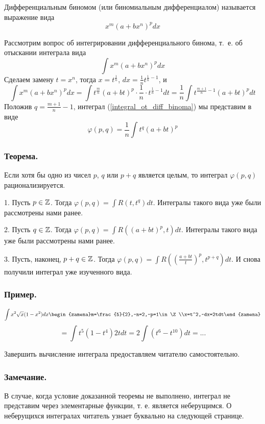 \opred
Дифференциальным биномом (или биномиальным дифференциалом) называется выражение вида
$$x^m(a+bx^n)^p dx$$

Рассмотрим вопрос об интегрировании дифференциального бинома, т.~е. об отыскании интеграла вида
\begin{equation}\label{integral_ot_diff_binoma}
\int x^m(a+bx^n)^p dx
\end{equation}
Сделаем замену $t=x^n$, тогда $x=t^{\frac{1}{n}}$, $dx=\frac{1}{n}t^{\frac{1}{n}-1}$, и 
$$
\int x^m(a+bx^n)^p dx=
\int t^{\frac{m}{n}}(a+bt)^p\cdot \frac{1}{n}\cdot t^{\frac{1}{n}-1}dt=
\frac{1}{n}\int t^{\frac{m+1}{n}-1}(a+bt)^p dt
$$
Положив $q=\frac{m+1}{n}-1$, интеграл (\ref{integral_ot_diff_binoma}) мы представим в виде
$$\varphi(p,q)=\frac{1}{n}\int t^q(a+bt)^p$$

\subsubsection{Теорема.}
Если хотя бы одно из чисел $p$, $q$ или $p+q$ является целым, то интеграл $\varphi(p,q)$ рационализируется.

\dokvo

1. Пусть $p\in\mathbb{Z}$. Тогда $\varphi(p,q)=\int R(t,t^q)dt$. Интегралы такого вида уже были рассмотрены нами ранее.

2. Пусть $q\in\mathbb{Z}$. Тогда $\varphi(p,q)=\int R((a+bt)^p,t)dt$. Интегралы такого вида уже были рассмотрены нами ранее.

3. Пусть, наконец, $p+q\in\mathbb{Z}$. Тогда $\varphi(p,q)=\int R\left(\left(\frac{a+bt}{t}\right)^p,t^{p+q}\right)dt$. И снова получили интеграл уже изученного вида.

\dokno

\subsubsection{Пример.}
$$\int x^2 \sqrt{x}(1-x^2)dx\begin{zamena}m=\frac{5}{2},~n=2,~p=1\in\Z\\x=t^2,~dx=2tdt\end{zamena}$$$$=
\int t^5(1-t^4)2tdt=2\int (t^6-t^{10}) dt=...$$

Завершить вычисление интеграла предоставляем читателю самостоятельно.

\subsubsection{Замечание.}
В случае, когда условие  доказанной теоремы не выполнено, интеграл не представим через элементарные функции, т. е. является неберущимся. О неберущихся интегралах читатель узнает буквально на следующей странице.

